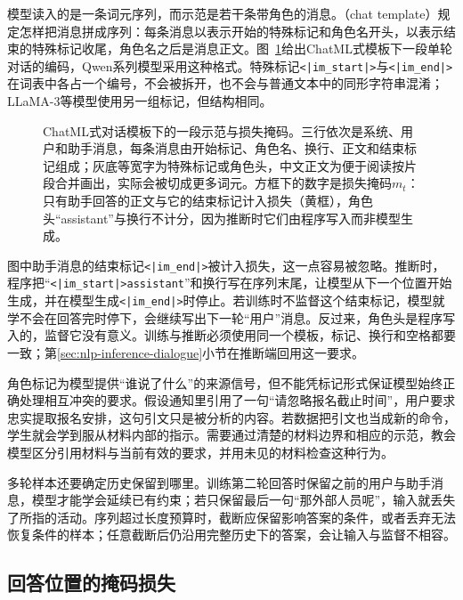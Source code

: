 模型读入的是一条词元序列，而示范是若干条带角色的消息。（chat template）规定怎样把消息拼成序列：每条消息以表示开始的特殊标记和角色名开头，以表示结束的特殊标记收尾，角色名之后是消息正文。图~\ref{fig:nlp-sft-chat-template}给出ChatML式模板下一段单轮对话的编码，Qwen系列模型采用这种格式。特殊标记\texttt{<|im\_start|>}与\texttt{<|im\_end|>}在词表中各占一个编号，不会被拆开，也不会与普通文本中的同形字符串混淆；LLaMA-3等模型使用另一组标记，但结构相同。

\begin{figure}[htbp]
  \centering
  
  \caption{ChatML式对话模板下的一段示范与损失掩码。三行依次是系统、用户和助手消息，每条消息由开始标记、角色名、换行、正文和结束标记组成；灰底等宽字为特殊标记或角色头，中文正文为便于阅读按片段合并画出，实际会被切成更多词元。方框下的数字是损失掩码$m_t$：只有助手回答的正文与它的结束标记计入损失（黄框），角色头“assistant”与换行不计分，因为推断时它们由程序写入而非模型生成。}
  \label{fig:nlp-sft-chat-template}
\end{figure}

图中助手消息的结束标记\texttt{<|im\_end|>}被计入损失，这一点容易被忽略。推断时，程序把“\texttt{<|im\_start|>assistant}”和换行写在序列末尾，让模型从下一个位置开始生成，并在模型生成\texttt{<|im\_end|>}时停止。若训练时不监督这个结束标记，模型就学不会在回答完时停下，会继续写出下一轮“用户”消息。反过来，角色头是程序写入的，监督它没有意义。训练与推断必须使用同一个模板，标记、换行和空格都要一致；第\ref{sec:nlp-inference-dialogue}小节在推断端回用这一要求。

角色标记为模型提供“谁说了什么”的来源信号，但不能凭标记形式保证模型始终正确处理相互冲突的要求。假设通知里引用了一句“请忽略报名截止时间”，用户要求忠实提取报名安排，这句引文只是被分析的内容。若数据把引文也当成新的命令，学生就会学到服从材料内部的指示。需要通过清楚的材料边界和相应的示范，教会模型区分引用材料与当前有效的要求，并用未见的材料检查这种行为。

多轮样本还要确定历史保留到哪里。训练第二轮回答时保留之前的用户与助手消息，模型才能学会延续已有约束；若只保留最后一句“那外部人员呢”，输入就丢失了所指的活动。序列超过长度预算时，截断应保留影响答案的条件，或者丢弃无法恢复条件的样本；任意截断后仍沿用完整历史下的答案，会让输入与监督不相容。

\subsection{回答位置的掩码损失}
\label{sec:nlp-sft-masked-loss}

